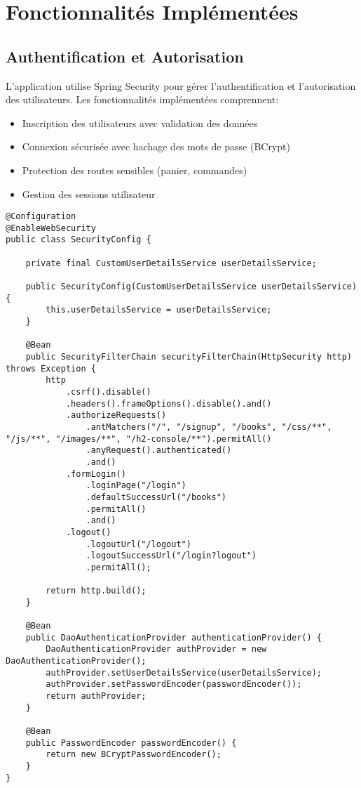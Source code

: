 \documentclass[12pt,a4paper]{report}
\begin{document}
\chapter{Fonctionnalités Implémentées}

\section{Authentification et Autorisation}
L'application utilise Spring Security pour gérer l'authentification et l'autorisation des utilisateurs. Les fonctionnalités implémentées comprennent:

\begin{itemize}
    \item Inscription des utilisateurs avec validation des données
    \item Connexion sécurisée avec hachage des mots de passe (BCrypt)
    \item Protection des routes sensibles (panier, commandes)
    \item Gestion des sessions utilisateur
\end{itemize}

\begin{lstlisting}[caption=Configuration de la sécurité avec Spring Security]
@Configuration
@EnableWebSecurity
public class SecurityConfig {

    private final CustomUserDetailsService userDetailsService;
    
    public SecurityConfig(CustomUserDetailsService userDetailsService) {
        this.userDetailsService = userDetailsService;
    }

    @Bean
    public SecurityFilterChain securityFilterChain(HttpSecurity http) throws Exception {
        http
            .csrf().disable()
            .headers().frameOptions().disable().and()
            .authorizeRequests()
                .antMatchers("/", "/signup", "/books", "/css/**", "/js/**", "/images/**", "/h2-console/**").permitAll()
                .anyRequest().authenticated()
                .and()
            .formLogin()
                .loginPage("/login")
                .defaultSuccessUrl("/books")
                .permitAll()
                .and()
            .logout()
                .logoutUrl("/logout")
                .logoutSuccessUrl("/login?logout")
                .permitAll();
        
        return http.build();
    }

    @Bean
    public DaoAuthenticationProvider authenticationProvider() {
        DaoAuthenticationProvider authProvider = new DaoAuthenticationProvider();
        authProvider.setUserDetailsService(userDetailsService);
        authProvider.setPasswordEncoder(passwordEncoder());
        return authProvider;
    }
    
    @Bean
    public PasswordEncoder passwordEncoder() {
        return new BCryptPasswordEncoder();
    }
}
\end{lstlisting}
\end{document}
